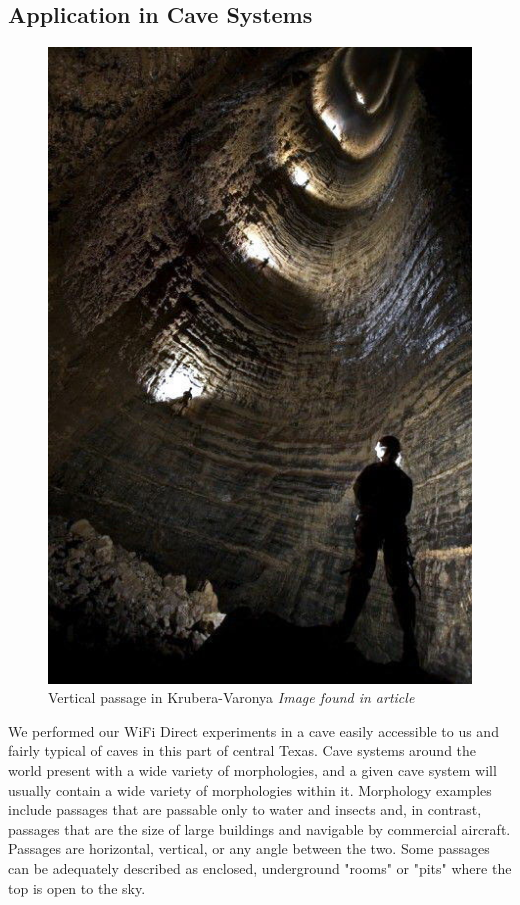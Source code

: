 \documentclass[10pt,twocolumn]{article}
\begin{document}
\subsection{Application in Cave Systems}
\label{sec:Application in Cave Systems}
\begin{figure}
\includegraphics[width=\columnwidth]{krubera_pit_dark}
\caption{Vertical passage in Krubera-Varonya \textit{Image found in article \cite{krub_blaze}}}
\end{figure}
We performed our WiFi Direct experiments in a cave easily accessible to us and fairly typical of caves in this part of central Texas.
Cave systems around the world present with a wide variety of morphologies, and a given cave system will usually contain a wide variety of morphologies within it.
Morphology examples include passages that are passable only to water and insects and, in contrast, passages that are the size of large buildings and navigable by commercial aircraft.
Passages are horizontal, vertical, or any angle between the two.
Some passages can be adequately described as enclosed, underground "rooms" or "pits" where the top is open to the sky.
\end{document}
